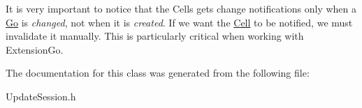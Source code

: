It is very important to notice that the Cells gets change notifications only when a \hyperlink{classHurricane_1_1Go}{Go} is {\itshape changed}, not when it is {\itshape created}. If we want the \hyperlink{classHurricane_1_1Cell}{Cell} to be notified, we must invalidate it manually. This is particularly critical when working with Extension\+Go. 

The documentation for this class was generated from the following file\+:\begin{DoxyCompactItemize}
\item 
Update\+Session.\+h\end{DoxyCompactItemize}
